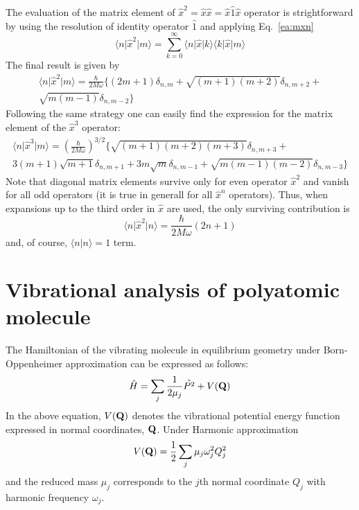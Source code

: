 \documentclass[a4paper,titlepage,twoside,fleqn,12pt]{book}
\begin{document}
\begin{appendices}
The evaluation of the matrix element of $\hat{x}^2=\hat{x}\hat{x}=\hat{x}\hat{1}\hat{x}$ 
operator is strightforward
by using the resolution of identity operator $\hat{1}$ and applying Eq.~\eqref{ea:mxn}
%
\begin{equation}
\langle n \vert \hat{x}^2 \vert m \rangle = 
\sum_{k=0}^{\infty} \langle n \vert \hat{x} \vert k \rangle \langle k \vert \hat{x} \vert m \rangle
\end{equation}
%
The final result is given by
%
\begin{multline}
\label{ea:mxxn}
\langle n \vert \hat{x}^2 \vert m \rangle = 
\frac{\hbar}{2M\omega}
\Big\{ 
   (2m+1) \delta_{n,m} + \sqrt{(m+1)(m+2)} \delta_{n,m+2} + \\
                         \sqrt{m(m-1)} \delta_{n,m-2}
\Big\}
\end{multline}
%
Following the same strategy one can easily find the expression for 
the matrix element of the $\hat{x}^3$ operator:
%
\begin{multline}
\label{ea:mxxxn}
\langle n \vert \hat{x}^3 \vert m \rangle = 
\left(
\frac{\hbar}{2M\omega}
\right)^{3/2}
\Big\{ 
   \sqrt{(m+1)(m+2)(m+3)} \delta_{n,m+3} + \\
   3(m+1)\sqrt{m+1} \delta_{n,m+1}
      +3m\sqrt{m}   \delta_{n,m-1} + \sqrt{m(m-1)(m-2)} \delta_{n,m-3}
\Big\}
\end{multline}
%
Note that diagonal matrix elements survive only for even operator $\hat{x}^2$
and vanish for all odd operators (it is true in generall for all $\hat{x}^n$
operators). Thus, when expansions up to the third order in $\hat{x}$ are 
used, the only surviving contribution is
%
\begin{equation}
\label{ea:mxm}
\langle n \vert \hat{x}^2 \vert n \rangle = 
\frac{\hbar}{2M\omega}(2n+1)
\end{equation}
%
and, of course, $\langle n \vert n \rangle=1$ term.

\section{Vibrational analysis of polyatomic molecule\label{asec:vibranal}}

The Hamiltonian of the vibrating molecule in equilibrium geometry under Born\hyp{}Oppenheimer approximation
can be expressed as follows:
\begin{equation}
\hat{H} = \sum_j \frac{1}{2\mu_j}\hat{{P}^2} + V({\bf Q})
\end{equation}
In the above equation, $V({\bf Q})$ denotes the vibrational potential energy function
expressed in normal coordinates, ${\bf Q}$. Under Harmonic approximation
\begin{equation}
V({\bf Q}) = \frac{1}{2} \sum_j \mu_j \omega_j^2 Q_j^2
\end{equation}
and the reduced mass $\mu_j$ corresponds to the $j$th normal coordinate $Q_j$ with
harmonic frequency $\omega_j$.


\end{appendices}
\end{document}
